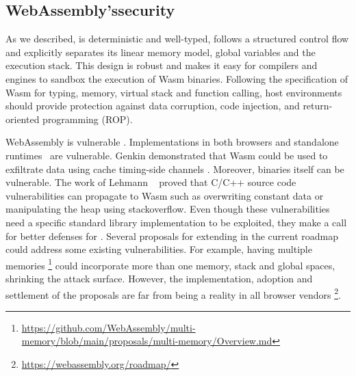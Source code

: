 \subsection{WebAssembly'ssecurity}

As we described, \wasm is deterministic and well-typed, follows a structured control flow and explicitly separates its linear memory model, global variables and the execution stack. This design is robust \cite{WebAssemblySecurity} and makes it easy for compilers and engines to sandbox the execution of Wasm  binaries. Following the specification of Wasm  for typing, memory, virtual stack and function calling,
host environments should provide protection against data corruption, code injection, and return-oriented programming (ROP).

WebAssembly is vulnerable \cite{ChromeZero}.
Implementations in both browsers and standalone runtimes~\cite{Narayan2021Swivel} are vulnerable.
Genkin \etal demonstrated that Wasm  could be used to exfiltrate data using cache timing-side channels \cite{Genkin2018DrivebyKC}.
Moreover, binaries itself can be vulnerable. The work of Lehmann \etal ~\cite{usenixWasm2020} proved that C/C++ source code vulnerabilities can propagate to Wasm  such as overwriting constant data or manipulating the heap using stackoverflow. Even though these vulnerabilities need a specific standard library implementation to be exploited, they make a call for better defenses for \wasm. 
Several proposals for extending \wasm in the current roadmap could address some existing vulnerabilities. For example, having multiple memories \footnote{\url{https://github.com/WebAssembly/multi-memory/blob/main/proposals/multi-memory/Overview.md}} could incorporate more than one memory, stack and global spaces, shrinking the attack surface. However, the implementation, adoption and settlement of the proposals are far from being a reality in all browser vendors \footnote{\url{https://webassembly.org/roadmap/}}.

